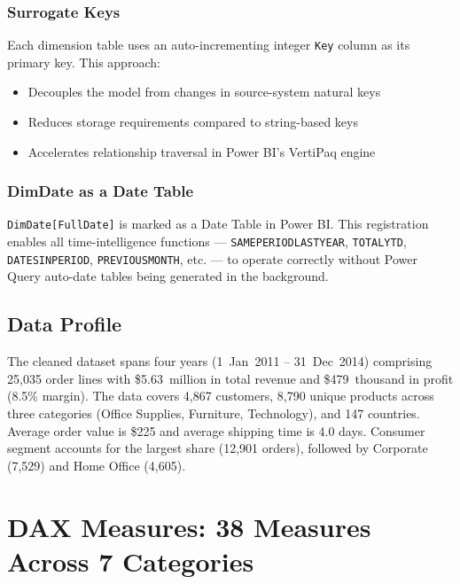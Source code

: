 \documentclass[11pt,a4paper]{article}
\begin{document}
\subsubsection{Surrogate Keys}
Each dimension table uses an auto-incrementing integer \texttt{Key} column as its primary key. This approach:
\begin{itemize}
    \item Decouples the model from changes in source-system natural keys
    \item Reduces storage requirements compared to string-based keys
    \item Accelerates relationship traversal in Power BI's VertiPaq engine
\end{itemize}

\subsubsection{DimDate as a Date Table}
\texttt{DimDate[FullDate]} is marked as a Date Table in Power BI. This registration enables all time-intelligence functions --- \texttt{SAMEPERIODLASTYEAR}, \texttt{TOTALYTD}, \texttt{DATESINPERIOD}, \texttt{PREVIOUSMONTH}, etc. --- to operate correctly without Power Query auto-date tables being generated in the background.

\subsection{Data Profile}

The cleaned dataset spans four years (1~Jan~2011 -- 31~Dec~2014) comprising 25,035 order
lines with \$5.63~million in total revenue and \$479~thousand in profit (8.5\% margin).
The data covers 4,867 customers, 8,790 unique products across three categories
(Office Supplies, Furniture, Technology), and 147 countries. Average order value is
\$225 and average shipping time is 4.0 days. Consumer segment accounts for the largest
share (12,901 orders), followed by Corporate (7,529) and Home Office (4,605).

\newpage

\section{DAX Measures: 38 Measures Across 7 Categories}
\end{document}
